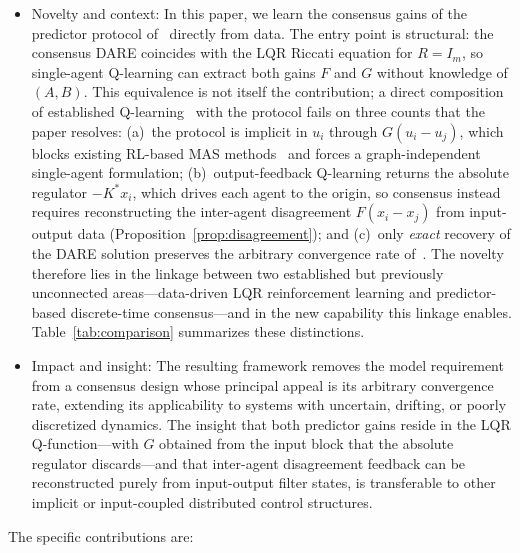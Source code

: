 \documentclass[12pt]{elsarticle}
\theoremstyle{remark}
\begin{document}
\begin{itemize}
\item Novelty and context: In this paper, we learn the consensus gains of the predictor protocol of~\cite{cacace2024} directly from data. The entry point is structural: the consensus DARE coincides with the LQR Riccati equation for $R = I_m$, so single-agent Q-learning can extract both gains $F$ and $G$ without knowledge of $(A,B)$. This equivalence is not itself the contribution; a direct composition of established Q-learning~\cite{bradtke1994,lewis2009,rizvi2022} with the protocol fails on three counts that the paper resolves: (a)~the protocol is implicit in $u_i$ through $G(u_i-u_j)$, which blocks existing RL-based MAS methods~\cite{zhang2011} and forces a graph-independent single-agent formulation; (b)~output-feedback Q-learning returns the absolute regulator $-K^*x_i$, which drives each agent to the origin, so consensus instead requires reconstructing the inter-agent disagreement $F(x_i-x_j)$ from input-output data (Proposition~\ref{prop:disagreement}); and (c)~only \emph{exact} recovery of the DARE solution preserves the arbitrary convergence rate of~\cite{cacace2024}. The novelty therefore lies in the linkage between two established but previously unconnected areas---data-driven LQR reinforcement learning and predictor-based discrete-time consensus---and in the new capability this linkage enables. Table~\ref{tab:comparison} summarizes these distinctions.
\item Impact and insight: The resulting framework removes the model requirement from a consensus design whose principal appeal is its arbitrary convergence rate, extending its applicability to systems with uncertain, drifting, or poorly discretized dynamics. The insight that both predictor gains reside in the LQR Q-function---with $G$ obtained from the input block that the absolute regulator discards---and that inter-agent disagreement feedback can be reconstructed purely from input-output filter states, is transferable to other implicit or input-coupled distributed control structures.
\end{itemize}
The specific contributions are:
\end{document}
